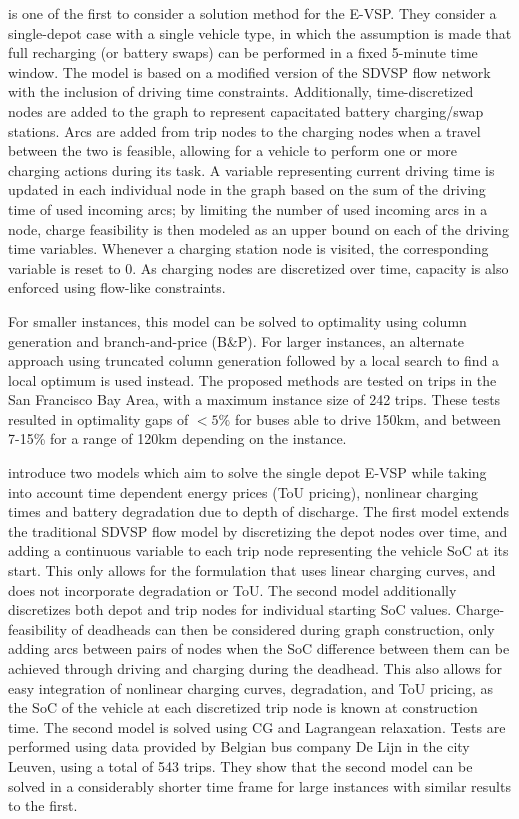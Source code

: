 \documentclass[]{article}
\begin{document}
\citet{Li2014} is one of the first to consider a solution method for the E-VSP. They consider a single-depot case with a single vehicle type, in which the assumption is made that full recharging (or battery swaps) can be performed in a fixed 5-minute time window. The model is based on a modified version of the SDVSP flow network with the inclusion of driving time constraints. Additionally, time-discretized nodes are added to the graph to represent capacitated battery charging/swap stations. Arcs are added from trip nodes to the charging nodes when a travel between the two is feasible, allowing for a vehicle to perform one or more charging actions during its task. A variable representing current driving time is updated in each individual node in the graph based on the sum of the driving time of used incoming arcs; by limiting the number of used incoming arcs in a node, charge feasibility is then modeled as an upper bound on each of the driving time variables. Whenever a charging station node is visited, the corresponding variable is reset to 0. As charging nodes are discretized over time, capacity is also enforced using flow-like constraints. 

For smaller instances, this model can be solved to optimality using column generation and branch-and-price (B\&P). For larger instances, an alternate approach using truncated column generation followed by a local search to find a local optimum is used instead. The proposed methods are tested on trips in the San Francisco Bay Area, with a maximum instance size of 242 trips. These tests resulted in optimality gaps of $<5\%$ for buses able to drive 150km, and between 7-15\%  for a range of 120km depending on the instance.

 introduce two models which aim to solve the single depot E-VSP while taking into account time dependent energy prices (ToU pricing), nonlinear charging times and battery degradation due to depth of discharge. The first model extends the traditional SDVSP flow model by discretizing the depot nodes over time, and adding a continuous variable to each trip node representing the vehicle SoC at its start. This only allows for the formulation that uses linear charging curves, and does not incorporate degradation or ToU. The second model additionally discretizes both depot and trip nodes for individual starting SoC values. Charge-feasibility of deadheads can then be considered during graph construction, only adding arcs between pairs of nodes when the SoC difference between them can be achieved through driving and charging during the deadhead. This also allows for easy integration of nonlinear charging curves, degradation, and ToU pricing, as the SoC of the vehicle at each discretized trip node is known at construction time. The second model is solved using CG and Lagrangean relaxation. Tests are performed using data provided by Belgian bus company De Lijn in the city Leuven, using a total of 543 trips. They show that the second model can be solved in a considerably shorter time frame for large instances with similar results to the first.
\end{document}
